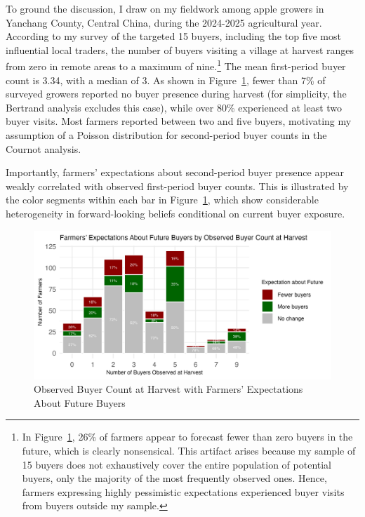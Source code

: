 To ground the discussion, I draw on my fieldwork among apple growers in Yanchang County, Central China, during the 2024-2025 agricultural year. According to my survey of the targeted 15 buyers, including the top five most influential local traders, the number of buyers visiting a village at harvest ranges from zero in remote areas to a maximum of nine.\footnote{In Figure~\ref{Figure: buyer count at harvest}, 26\% of farmers appear to forecast fewer than zero buyers in the future, which is clearly nonsensical. This artifact arises because my sample of 15 buyers does not exhaustively cover the entire population of potential buyers, only the majority of the most frequently observed ones. Hence, farmers expressing highly pessimistic expectations experienced buyer visits from buyers outside my sample.} The mean first-period buyer count is 3.34, with a median of 3. As shown in Figure~\ref{Figure: buyer count at harvest}, fewer than 7\% of surveyed growers reported no buyer presence during harvest (for simplicity, the Bertrand analysis excludes this case), while over 80\% experienced at least two buyer visits. Most farmers reported between two and five buyers, motivating my assumption of a Poisson distribution for second-period buyer counts in the Cournot analysis.

Importantly, farmers' expectations about second-period buyer presence appear weakly correlated with observed first-period buyer counts. This is illustrated by the color segments within each bar in Figure~\ref{Figure: buyer count at harvest}, which show considerable heterogeneity in forward-looking beliefs conditional on current buyer exposure.

\begin{figure}[ht!]
\centering
\includegraphics[width=\textwidth]{figures/buyer_count_distribution.png}
\caption{Observed Buyer Count at Harvest with Farmers' Expectations About Future Buyers}
\label{Figure: buyer count at harvest}
\end{figure}


